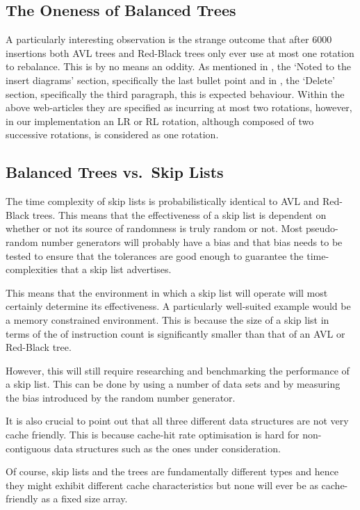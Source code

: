 \documentclass[article]{uom-coursework}
\begin{document}
\subsection{The Oneness of Balanced Trees}

A particularly interesting observation is the strange outcome
that after 6000 insertions both AVL trees and Red-Black trees
only ever use at most one rotation to rebalance. This is by no
means an oddity. As mentioned in \textcite{wikirbtree}, the
`Noted to the insert diagrams' section, specifically the last
bullet point and in \textcite{wikiavltree}, the `Delete'
section, specifically the third paragraph, this is expected
behaviour. Within the above web-articles they are specified as
incurring at most two rotations, however, in our implementation
an LR or RL rotation, although composed of two successive
rotations, is considered as one rotation.

\subsection{Balanced Trees vs.\ Skip Lists}

The time complexity of skip lists is probabilistically identical
to AVL and Red-Black trees. This means that the effectiveness of
a skip list is dependent on whether or not its source of
randomness is truly random or not. Most pseudo-random number
generators will probably have a bias and that bias needs to be
tested to ensure that the tolerances are good enough to
guarantee the time-complexities that a skip list advertises.

This means that the environment in which a skip list will
operate will most certainly determine its effectiveness. A
particularly well-suited example would be a memory constrained
environment. This is because the size of a skip list in terms of
the of instruction count is significantly smaller than that of
an AVL or Red-Black tree.

However, this will still require researching and benchmarking
the performance of a skip list. This can be done by using a
number of data sets and by measuring the bias introduced by the
random number generator.

It is also crucial to point out that all three different data
structures are not very cache friendly. This is because
cache-hit rate optimisation is hard for non-contiguous data
structures such as the ones under consideration.

Of course, skip lists and the trees are fundamentally different
types and hence they might exhibit different cache
characteristics but none will ever be as cache-friendly as a
fixed size array.
\end{document}
